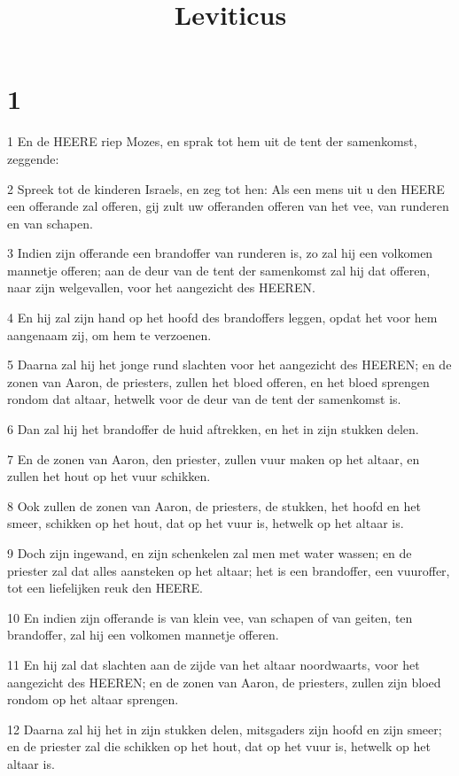 

\title{Leviticus}



\chapter{1}

\par 1 En de HEERE riep Mozes, en sprak tot hem uit de tent der samenkomst, zeggende:
\par 2 Spreek tot de kinderen Israels, en zeg tot hen: Als een mens uit u den HEERE een offerande zal offeren, gij zult uw offeranden offeren van het vee, van runderen en van schapen.
\par 3 Indien zijn offerande een brandoffer van runderen is, zo zal hij een volkomen mannetje offeren; aan de deur van de tent der samenkomst zal hij dat offeren, naar zijn welgevallen, voor het aangezicht des HEEREN.
\par 4 En hij zal zijn hand op het hoofd des brandoffers leggen, opdat het voor hem aangenaam zij, om hem te verzoenen.
\par 5 Daarna zal hij het jonge rund slachten voor het aangezicht des HEEREN; en de zonen van Aaron, de priesters, zullen het bloed offeren, en het bloed sprengen rondom dat altaar, hetwelk voor de deur van de tent der samenkomst is.
\par 6 Dan zal hij het brandoffer de huid aftrekken, en het in zijn stukken delen.
\par 7 En de zonen van Aaron, den priester, zullen vuur maken op het altaar, en zullen het hout op het vuur schikken.
\par 8 Ook zullen de zonen van Aaron, de priesters, de stukken, het hoofd en het smeer, schikken op het hout, dat op het vuur is, hetwelk op het altaar is.
\par 9 Doch zijn ingewand, en zijn schenkelen zal men met water wassen; en de priester zal dat alles aansteken op het altaar; het is een brandoffer, een vuuroffer, tot een liefelijken reuk den HEERE.
\par 10 En indien zijn offerande is van klein vee, van schapen of van geiten, ten brandoffer, zal hij een volkomen mannetje offeren.
\par 11 En hij zal dat slachten aan de zijde van het altaar noordwaarts, voor het aangezicht des HEEREN; en de zonen van Aaron, de priesters, zullen zijn bloed rondom op het altaar sprengen.
\par 12 Daarna zal hij het in zijn stukken delen, mitsgaders zijn hoofd en zijn smeer; en de priester zal die schikken op het hout, dat op het vuur is, hetwelk op het altaar is.
